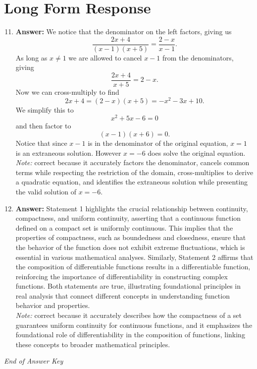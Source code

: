 \documentclass[12pt]{article}
\begin{document}
\section*{Long Form Response}
\begin{enumerate}[label=\arabic*.]
\setcounter{enumi}{10}
\item \textbf{Answer:} We notice that the denominator on the left factors, giving us \[\frac{2 x+4}{(x-1)(x+5)}=\frac{2-x}{x-1}.\]As long as $x\neq 1$ we are allowed to cancel $x-1$ from the denominators, giving \[\frac{2 x+4}{x+5}=2-x.\]Now we can cross-multiply to find \[2 x+4=(2-x)(x+5)=-x^2-3 x+10.\]We simplify this to \[x^2+5 x-6=0\]and then factor to \[(x-1)(x+6)=0.\]Notice that since $x-1$ is in the denominator of the original equation, $x=1$ is an extraneous solution. However $x=\boxed{-6}$ does solve the original equation.
\\ \textit{Note:} correct because it accurately factors the denominator, cancels common terms while respecting the restriction of the domain, cross-multiplies to derive a quadratic equation, and identifies the extraneous solution while presenting the valid solution of \( x = -6 \).
\item \textbf{Answer:} Statement 1 highlights the crucial relationship between continuity, compactness, and uniform continuity, asserting that a continuous function defined on a compact set is uniformly continuous. This implies that the properties of compactness, such as boundedness and closedness, ensure that the behavior of the function does not exhibit extreme fluctuations, which is essential in various mathematical analyses. Similarly, Statement 2 affirms that the composition of differentiable functions results in a differentiable function, reinforcing the importance of differentiability in constructing complex functions. Both statements are true, illustrating foundational principles in real analysis that connect different concepts in understanding function behavior and properties.
\\ \textit{Note:} correct because it accurately describes how the compactness of a set guarantees uniform continuity for continuous functions, and it emphasizes the foundational role of differentiability in the composition of functions, linking these concepts to broader mathematical principles.
\end{enumerate}

\vfill
\noindent\textit{End of Answer Key}
\end{document}
